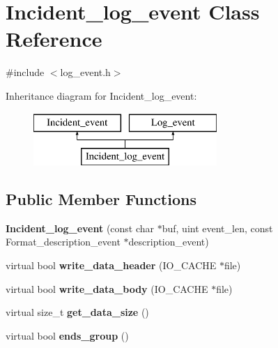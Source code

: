 \hypertarget{classIncident__log__event}{}\section{Incident\+\_\+log\+\_\+event Class Reference}
\label{classIncident__log__event}


{\ttfamily \#include $<$log\+\_\+event.\+h$>$}

Inheritance diagram for Incident\+\_\+log\+\_\+event\+:\begin{figure}[H]
\begin{center}
\leavevmode
\includegraphics[height=2.000000cm]{classIncident__log__event}
\end{center}
\end{figure}
\subsection*{Public Member Functions}
\begin{DoxyCompactItemize}
\item 
\mbox{\label{classIncident__log__event_a419fc77135d0e270e525fee817e451c9}} 
{\bfseries Incident\+\_\+log\+\_\+event} (const char $\ast$buf, uint event\+\_\+len, const Format\+\_\+description\+\_\+event $\ast$description\+\_\+event)
\item 
\mbox{\label{classIncident__log__event_ac81042c6c7b3dc844bee34fe9b003280}} 
virtual bool {\bfseries write\+\_\+data\+\_\+header} (I\+O\+\_\+\+C\+A\+C\+HE $\ast$file)
\item 
\mbox{\label{classIncident__log__event_a5016a5ec90cc19bdb07a17c5363b5c51}} 
virtual bool {\bfseries write\+\_\+data\+\_\+body} (I\+O\+\_\+\+C\+A\+C\+HE $\ast$file)
\item 
\mbox{\label{classIncident__log__event_a733ac5198f78e34a6494a1710938c9c4}} 
virtual size\+\_\+t {\bfseries get\+\_\+data\+\_\+size} ()
\item 
\mbox{\label{classIncident__log__event_ac3506726f541d38ed7d08133302f101e}} 
virtual bool {\bfseries ends\+\_\+group} ()
\end{DoxyCompactItemize}
